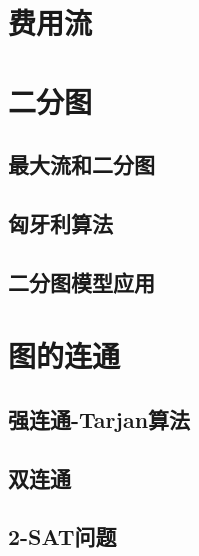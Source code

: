 \documentclass[fontset=ubuntu]{ctexbook}
\begin{document}
    \section{费用流}
    \section{二分图}
    \subsection{最大流和二分图}
    \subsection{匈牙利算法}
    \subsection{二分图模型应用}
    \section{图的连通}
    \subsection{强连通-Tarjan算法}
    \subsection{双连通}
    \subsection{2-SAT问题}
\end{document}

